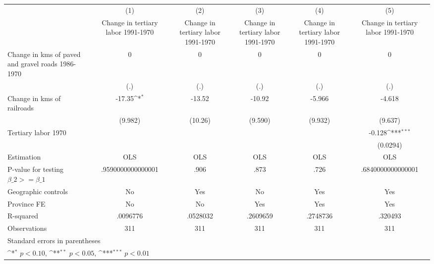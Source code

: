 {
\def\sym#1{\ifmmode^{#1}\else\(^{#1}\)\fi}
\begin{tabular}{l*{5}{c}}
\hline\hline
                    &\multicolumn{1}{c}{(1)}&\multicolumn{1}{c}{(2)}&\multicolumn{1}{c}{(3)}&\multicolumn{1}{c}{(4)}&\multicolumn{1}{c}{(5)}\\
                    &\multicolumn{1}{c}{Change in tertiary labor 1991-1970}&\multicolumn{1}{c}{Change in tertiary labor 1991-1970}&\multicolumn{1}{c}{Change in tertiary labor 1991-1970}&\multicolumn{1}{c}{Change in tertiary labor 1991-1970}&\multicolumn{1}{c}{Change in tertiary labor 1991-1970}\\
\hline
Change in kms of paved and gravel roads 1986-1970&           0         &           0         &           0         &           0         &           0         \\
                    &         (.)         &         (.)         &         (.)         &         (.)         &         (.)         \\
[1em]
Change in kms of railroads&      -17.35\sym{*}  &      -13.52         &      -10.92         &      -5.966         &      -4.618         \\
                    &     (9.982)         &     (10.26)         &     (9.590)         &     (9.932)         &     (9.637)         \\
[1em]
Tertiary labor 1970 &                     &                     &                     &                     &      -0.128\sym{***}\\
                    &                     &                     &                     &                     &    (0.0294)         \\
\hline
Estimation          &         OLS         &         OLS         &         OLS         &         OLS         &         OLS         \\
P-value for testing $\beta\_2 >= \beta\_1$&.9590000000000001         &        .906         &        .873         &        .726         &.6840000000000001         \\
Geographic controls &          No         &         Yes         &          No         &         Yes         &         Yes         \\
Province FE         &          No         &          No         &         Yes         &         Yes         &         Yes         \\
R-squared           &    .0096776         &    .0528032         &    .2609659         &    .2748736         &     .320493         \\
Observations        &         311         &         311         &         311         &         311         &         311         \\
\hline\hline
\multicolumn{6}{l}{\footnotesize Standard errors in parentheses}\\
\multicolumn{6}{l}{\footnotesize \sym{*} \(p<0.10\), \sym{**} \(p<0.05\), \sym{***} \(p<0.01\)}\\
\end{tabular}
}
